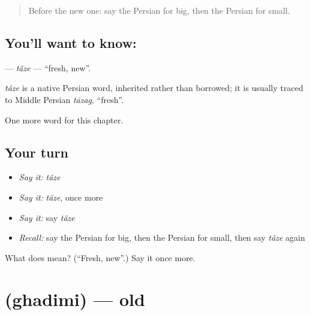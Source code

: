 \label{lesson:FA-C58-taze}



\begin{quote}
Before the new one: say the Persian for big, then the Persian for small.
\end{quote}

\subsection*{You'll want to know: }
\textbf{} — \emph{tâze} — \textquotedblleft{}fresh, new\textquotedblright{}.

\begin{cousinweb}
\emph{tâze} is a native Persian word, inherited rather than borrowed; it is usually traced to Middle Persian \emph{tāzag}, \textquotedblleft{}fresh\textquotedblright{}.
\end{cousinweb}

\begin{grammarlens}[title={What you've built}]
One more word for this chapter.
\end{grammarlens}

\subsection*{Your turn}
\begin{itemize}
\raggedright
  \item \emph{Say it:} \emph{tâze}
  \item \emph{Say it:} \emph{tâze}, once more
  \item \emph{Say it:} say \emph{tâze}
  \item \emph{Recall:} say the Persian for big, then the Persian for small, then say \emph{tâze} again
\end{itemize}

\begin{tcolorbox}[breakable,colback=teal!4,colframe=teal!35!black,title={Before you move on}]
What does  mean? (\textquotedblleft{}Fresh, new\textquotedblright{}.) Say it once more.
\end{tcolorbox}
\section[\texorpdfstring{\fa{قدیمی} (ghadimi)}{قدیمی (ghadimi)}]{ (ghadimi) — old}

\label{lesson:FA-C58-ghadimi}



